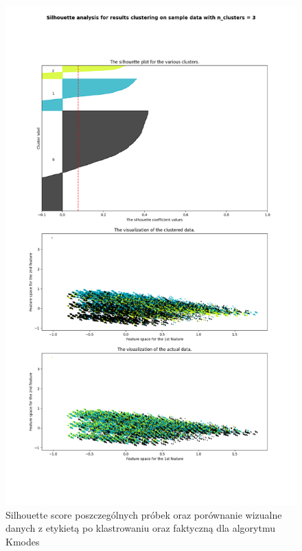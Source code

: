 \documentclass{classrep}
\begin{document}
{{{                 \begin{figure}[!htbp]
                    \centering
                    \includegraphics[width=1\textwidth]{img/clustering/kmodes_silhouette.png}
                    \caption{Silhouette score poszczególnych próbek oraz porównanie wizualne
                    danych z etykietą po klastrowaniu oraz faktyczną dla algorytmu Kmodes}
                    \label{silh_kmodes}
                \end{figure}
                \FloatBarrier
            }

}}
\end{document}
